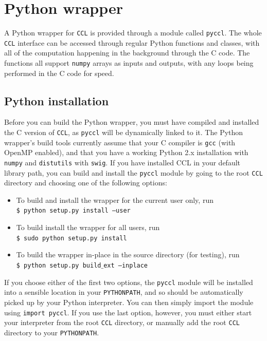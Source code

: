 \documentclass[\docopts]{\docclass}
\begin{document}
\section{Python wrapper}
\label{sec:python}

A Python wrapper for {\tt CCL} is provided through a module called {\tt pyccl}. The whole {\tt CCL} interface can be accessed through regular Python functions and classes, with all of the computation happening in the background through the C code. The functions all support {\tt numpy} arrays as inputs and outputs, with any loops being performed in the C code for speed.

\subsection{Python installation}
\label{sec:python:install}

Before you can build the Python wrapper, you must have compiled and installed the C version of {\tt CCL}, as {\tt pyccl} will be dynamically linked to it. The Python wrapper's build tools currently assume that your C compiler is {\tt gcc} (with OpenMP enabled), and that you have a working Python 2.x installation with {\tt numpy} and {\tt distutils} with {\tt swig}. If you have installed CCL in your default library path, you can build and install the {\tt pyccl} module by going to the root {\tt CCL} directory and choosing one of the following options:
\begin{itemize}
 \item To build and install the wrapper for the current user only, run \\
 {\tt \$ python setup.py install --user}
 \item To build install the wrapper for all users, run \\
 {\tt \$ sudo python setup.py install}
 \item To build the wrapper in-place in the source directory (for testing), run \\
 {\tt \$ python setup.py build$\_$ext --inplace}
\end{itemize}
If you choose either of the first two options, the {\tt pyccl} module will be installed into a sensible location in your {\tt PYTHONPATH}, and so should be automatically picked up by your Python interpreter. You can then simply import the module using {\tt import pyccl}. If you use the last option, however, you must either start your interpreter from the root {\tt CCL} directory, or manually add the root {\tt CCL} directory to your {\tt PYTHONPATH}.
\end{document}
